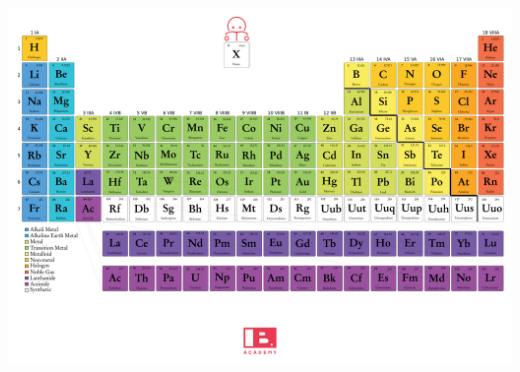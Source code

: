     \begin{center}
    \includegraphics[height=\linewidth,angle=90]{./FullPages/TPE.pdf}
    \end{center}


    
    
    
    
    
    


    
    
    


